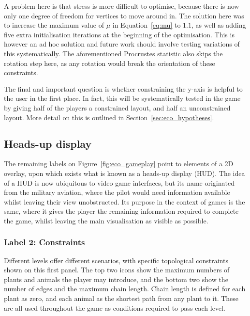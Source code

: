 A problem here is that stress is more difficult to optimise, because there is now only one degree of freedom for vertices to move around in. The solution here was to increase the maximum value of $\mu$ in Equation~\eqref{eq:mu} to $1.1$, as well as adding five extra initialisation iterations at the beginning of the optimisation. This is however an ad hoc solution and future work should involve testing variations of this systematically.
The aforementioned Procrustes statistic also skips the rotation step here, as any rotation would break the orientation of these constraints.

The final and important question is whether constraining the y-axis is helpful to the user in the first place. In fact, this will be systematically tested in the game by giving half of the players a constrained layout, and half an unconstrained layout. More detail on this is outlined in Section~\ref{sec:eco_hypotheses}.

\subsection{Heads-up display}
\label{sec:HUD}
The remaining labels on Figure~\ref{fig:eco_gameplay} point to elements of a 2D overlay, upon which exists what is known as a heads-up display (HUD). The idea of a HUD is now ubiquitous to video game interfaces, but its name originated from the military aviation, where the pilot would need information available whilst leaving their view unobstructed. 
Its purpose in the context of games is the same, where it gives the player the remaining information required to complete the game, whilst leaving the main visualisation as visible as possible.

\subsubsection{Label 2: Constraints}
Different levels offer different scenarios, with specific topological constraints shown on this first panel. The top two icons show the maximum numbers of plants and animals the player may introduce, and the bottom two show the number of edges and the maximum chain length. Chain length is defined for each plant as zero, and each animal as the shortest path from any plant to it. These are all used throughout the game as conditions required to pass each level.

